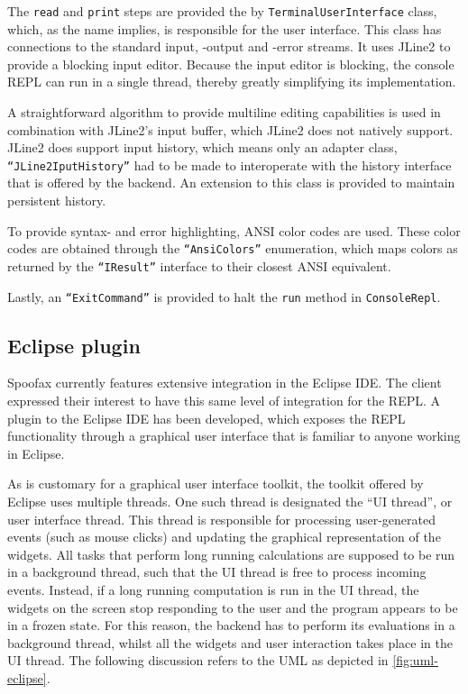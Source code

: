 The \texttt{read} and \texttt{print} steps are provided
the by \texttt{TerminalUserInterface} class, which, as the name implies, is
responsible for the user interface. This class has connections to the standard
input, -output and -error streams. It uses JLine2 to provide a blocking input
editor. Because the input editor is blocking, the console REPL can run in a
single thread, thereby greatly simplifying its implementation.

A straightforward algorithm to provide multiline editing capabilities is used in
combination with JLine2's input buffer, which JLine2 does not natively support.
JLine2 does support input history, which means only an adapter class,
\texttt{``JLine2IputHistory''} had to be made to interoperate with the history
interface that is offered by the backend. An extension to this class is provided
to maintain persistent history.

To provide syntax- and error highlighting, ANSI color codes are used. These
color codes are obtained through the \texttt{``AnsiColors''} enumeration, which
maps colors as returned by the \texttt{``IResult''} interface to their closest
ANSI equivalent.

Lastly, an \texttt{``ExitCommand''} is provided to halt the \texttt{run} method
in \texttt{ConsoleRepl}.

\subsection{Eclipse plugin}
\label{ssec:eclipse-plugin}

Spoofax currently features extensive integration in the Eclipse IDE. The client
expressed their interest to have this same level of integration for the REPL. A
plugin to the Eclipse IDE has been developed, which exposes the REPL
functionality through a graphical user interface that is familiar to anyone
working in Eclipse.

As is customary for a graphical user interface toolkit, the toolkit offered by
Eclipse uses multiple threads. One such thread is designated the ``UI thread'',
or user interface thread. This thread is responsible for processing
user-generated events (such as mouse clicks) and updating the graphical
representation of the widgets. All tasks that perform long running
calculations are supposed to be run in a background thread, such that the UI
thread is free to process incoming events. Instead, if a long running
computation is run in the UI thread, the widgets on the screen stop responding
to the user and the program appears to be in a frozen state. For this reason,
the backend has to perform its evaluations in a background thread, whilst all
the widgets and user interaction takes place in the UI thread.
The following discussion refers to the UML as depicted in
\cref{fig:uml-eclipse}.

